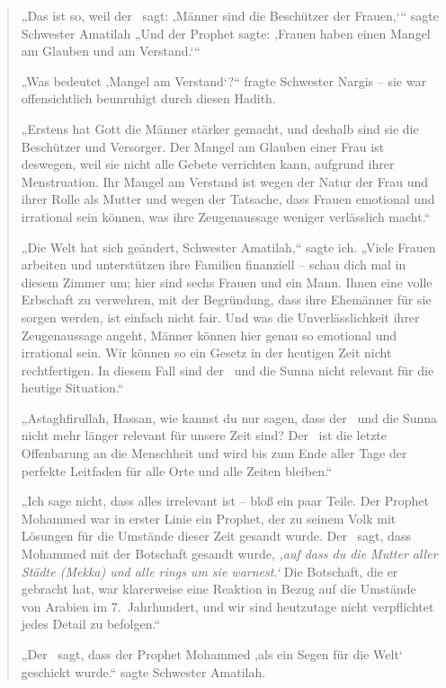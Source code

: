 \documentclass[12pt]{memoir}
\begin{document}
\begin{quote}
„Das ist so, weil der \Quran\ sagt: ‚Männer sind die Beschützer der Frauen,‘“
sagte Schwester Amatilah
„Und der Prophet sagte:
‚Frauen haben einen Mangel am Glauben und am Verstand.‘“

„Was bedeutet ‚Mangel am Verstand‘?“ fragte Schwester Nargis –
sie war offensichtlich beunruhigt durch diesen Hadith.

„Erstens hat Gott die Männer stärker gemacht,
und deshalb sind sie die Beschützer und Versorger.
Der Mangel am Glauben einer Frau ist deswegen,
weil sie nicht alle Gebete verrichten kann, aufgrund ihrer Menstruation.
Ihr Mangel am Verstand ist wegen der Natur der Frau
und ihrer Rolle als Mutter und wegen der Tatsache,
dass Frauen emotional und irrational sein können,
was ihre Zeugenaussage weniger verlässlich macht.“

„Die Welt hat sich geändert, Schwester Amatilah,“ sagte ich.
„Viele Frauen arbeiten und unterstützen ihre Familien finanziell –
schau dich mal in diesem Zimmer um; hier sind sechs Frauen und ein Mann.
Ihnen eine volle Erbschaft zu verwehren,
mit der Begründung, dass ihre Ehemänner für sie sorgen werden,
ist einfach nicht fair.
Und was die Unverlässlichkeit ihrer Zeugenaussage angeht,
Männer können hier genau so emotional und irrational sein.
Wir können so ein Gesetz in der heutigen Zeit nicht rechtfertigen.
In diesem Fall sind der \Quran\ und die Sunna
nicht relevant für die heutige Situation.“

„Astaghfirullah, Hassan, wie kannst du nur sagen,
dass der \Quran\ und die Sunna nicht mehr länger
relevant für unsere Zeit sind?
Der \Quran\ ist die letzte Offenbarung an die Menschheit
und wird bis zum Ende aller Tage der perfekte Leitfaden
für alle Orte und alle Zeiten bleiben.“

„Ich sage nicht, dass alles irrelevant ist – bloß ein paar Teile.
Der Prophet Mohammed war in erster Linie ein Prophet,
der zu seinem Volk mit Lösungen für die Umstände dieser Zeit gesandt wurde.
Der \Quran\ sagt, dass Mohammed mit der Botschaft gesandt wurde,
\emph{‚auf dass du die Mutter aller Städte (Mekka)
und alle rings um sie warnest.‘}
Die Botschaft, die er gebracht hat, war klarerweise
eine Reaktion in Bezug auf die Umstände von Arabien im 7.\ Jahrhundert,
und wir sind heutzutage nicht verpflichtet jedes Detail zu befolgen.“

„Der \Quran\ sagt, dass der Prophet Mohammed
‚als ein Segen für die Welt‘ geschickt wurde.“
sagte Schwester Amatilah.


\end{quote}
\end{document}
